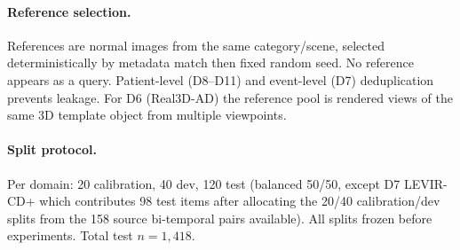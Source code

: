 \paragraph{Reference selection.}
References are normal images from the same category/scene, selected deterministically by metadata match then fixed random seed. No reference appears as a query. Patient-level (D8--D11) and event-level (D7) deduplication prevents leakage. For D6 (Real3D-AD) the reference pool is rendered views of the same 3D template object from multiple viewpoints.

\paragraph{Split protocol.}
Per domain: 20 calibration, 40 dev, 120 test (balanced 50/50, except D7 LEVIR-CD+ which contributes 98 test items after allocating the 20/40 calibration/dev splits from the 158 source bi-temporal pairs available). All splits frozen before experiments. Total test $n{=}1{,}418$.

